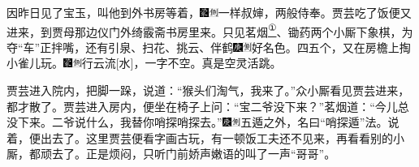 因昨日见了宝玉，叫他到外书房等着，{\includegraphics[width=3mm]{../Images/00006}\includegraphics[width=3mm]{../Images/00011}\footnotesize \kaishu 一样叔婶，两般侍奉。}贾芸吃了饭便又进来，到贾母那边仪门外绮霰斋书房里来。只见茗烟\href{../Text/part0028_split_000.html\#lnkback_1_a}{\textsuperscript{①}}、锄药两个小厮下象棋，为夺``车''正拌嘴，还有引泉、扫花、挑云、伴鹤{\includegraphics[width=3mm]{../Images/00004}\includegraphics[width=3mm]{../Images/00011}\footnotesize \kaishu 好名色。}四五个，又在房檐上掏小雀儿玩。{\includegraphics[width=3mm]{../Images/00006}\includegraphics[width=3mm]{../Images/00011}\footnotesize \kaishu 行云流{[}水{]}，一字不空。真是空灵活跳。}

贾芸进入院内，把脚一跺，说道：``猴头们淘气，我来了。''众小厮看见贾芸进来，都才散了。贾芸进入房内，便坐在椅子上问：``宝二爷没下来？''茗烟道：``今儿总没下来。二爷说什么，我替你哨探哨探去。''{\includegraphics[width=3mm]{../Images/00004}\includegraphics[width=3mm]{../Images/00011}\footnotesize \kaishu 五遁之外，名曰``哨探遁''法。}说着，便出去了。这里贾芸便看字画古玩，有一顿饭工夫还不见来，再看看别的小厮，都顽去了。正是烦闷，只听门前娇声嫩语的叫了一声``哥哥''。

